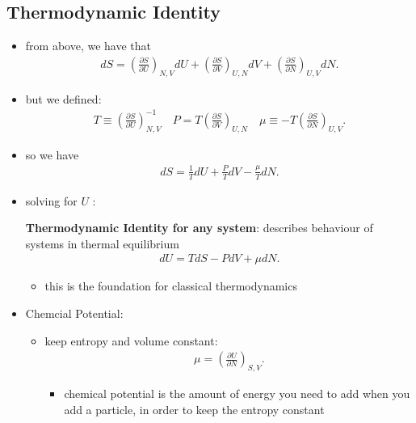 \documentclass[10pt]{article}
\begin{document}
\subsection{Thermodynamic Identity}
\begin{itemize}
    \item from above, we have that 
        \begin{gather*}
            dS = \left( \frac{\partial S}{\partial U}  \right)_{N,V}dU + \left( \frac{\partial S}{\partial V}  \right)_{U,N} dV + \left( \frac{\partial S}{\partial N}  \right)_{U,V} dN
        .\end{gather*}
    \item but we defined:
        \begin{gather*}
            T \equiv \left( \frac{\partial S}{\partial U}  \right)^{-1}_{N,V} \quad P = T \left( \frac{\partial S}{\partial V}  \right)_{U,N} \quad \mu \equiv -T \left( \frac{\partial S}{\partial N}  \right)_{U,V}
        .\end{gather*}
    \item so we have 
        \begin{gather*}
            dS = \frac{1}{T}dU + \frac{P}{T}dV - \frac{\mu}{T}dN
        .\end{gather*}
    \item solving for $U$ :
        \begin{theorem}
            \textbf{Thermodynamic Identity for any system}: describes behaviour of systems in thermal equilibrium
            \begin{gather*}
                dU = TdS - PdV + \mu dN
            .\end{gather*}
            \begin{itemize}
                \item this is the foundation for classical thermodynamics
            \end{itemize}
        \end{theorem}
    \item Chemcial Potential:
        \begin{itemize}
            \item keep entropy and volume constant:
                \begin{gather*}
                    \mu = \left( \frac{\partial U}{\partial N}  \right)_{S,V}
                .\end{gather*}
                \begin{itemize}
                    \item chemical potential is the amount of energy you need to add when you add a particle, in order to keep the entropy constant

\end{itemize}
\end{itemize}
\end{itemize}
\end{document}
